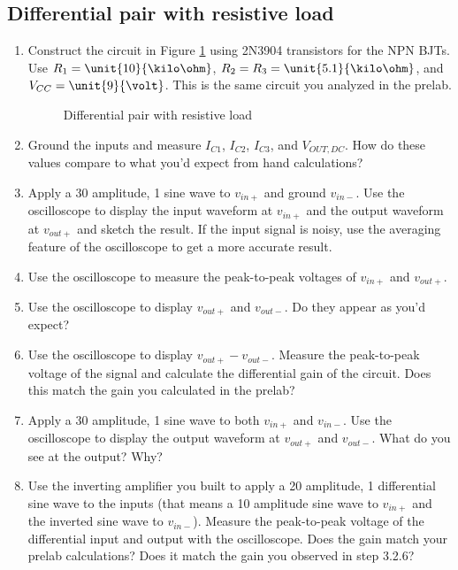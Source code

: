 \documentclass{article}
\begin{document}
\subsection{Differential pair with resistive load}

\begin{enumerate}
  \item Construct the circuit in Figure \ref{diff} using 2N3904 transistors for the NPN BJTs. Use $R_1 = \unit{10}{\kilo\ohm}$, $R_2 = R_3 = \unit{5.1}{\kilo\ohm}$, and $V_{CC}=\unit{9}{\volt}$. This is the same circuit you analyzed in the prelab.

\begin{figure}[!htb]
  
  \centerline{\box\graph}
  \caption{Differential pair with resistive load}
  \label{diff}
\end{figure}

  \item Ground the inputs and measure $I_{C1}$, $I_{C2}$, $I_{C3}$, and $V_{OUT,DC}$. How do these values compare to what you'd expect from hand calculations?
  \item Apply a \unit{30}{\milli\volt} amplitude, \unit{1}{\kilo\hertz} sine wave to $v_{in+}$ and ground $v_{in-}$. Use the oscilloscope to display the input waveform at $v_{in+}$ and the output waveform at $v_{out+}$ and sketch the result. If the input signal is noisy, use the averaging feature of the oscilloscope to get a more accurate result.
  \item Use the oscilloscope to measure the peak-to-peak voltages of $v_{in+}$ and $v_{out+}$.
  \item Use the oscilloscope to display $v_{out+}$ and $v_{out-}$. Do they appear as you'd expect?
  \item Use the oscilloscope to display $v_{out+} - v_{out-}$. Measure the peak-to-peak voltage of the signal and calculate the differential gain of the circuit. Does this match the gain you calculated in the prelab?
  \item Apply a \unit{30}{\milli\volt} amplitude, \unit{1}{\kilo\hertz} sine wave to both $v_{in+}$ and $v_{in-}$. Use the oscilloscope to display the output waveform at $v_{out+}$ and $v_{out-}$. What do you see at the output? Why?
  \item Use the inverting amplifier you built to apply a \unit{20}{\milli\volt} amplitude, \unit{1}{\kilo\hertz} differential sine wave to the inputs (that means a \unit{10}{\milli\volt} amplitude sine wave to $v_{in+}$ and the inverted sine wave to $v_{in-}$). Measure the peak-to-peak voltage of the differential input and output with the oscilloscope. Does the gain match your prelab calculations? Does it match the gain you observed in step 3.2.6?

\end{enumerate}
\end{document}
